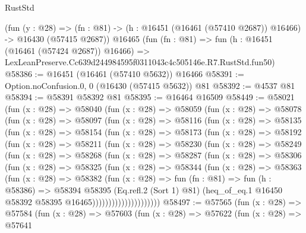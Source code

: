 \begin{lexlean}{RustStd}
\begin{coremodule}
    (fun (y : @28) =>
    (fn : @81) -> (h : @16451 (@16461 (@57410 @2687)) @16466) -> @16430 (@57415 @2687))
    @16465
    (fun (fn : @81) =>
    fun (h : @16451 (@16461 (@57424 @2687)) @16466) =>
    LexLeanPreserve.Cc639d244984595f0311043c4c505146e.R7.RustStd.fun50)
@58386 := @16451 (@16461 (@57410 @5632)) @16466
@58391 := Option.noConfusion.{0, 0} (@16430 (@57415 @5632)) @81
@58392 := @4537 @81
@58394 := @58391 @58392 @81
@58395 := @16464 @16509
@58449 := @58021
    (fun (x : @28) =>
    @58040
      (fun (x : @28) =>
      @58059
        (fun (x : @28) =>
        @58078
          (fun (x : @28) =>
          @58097
            (fun (x : @28) =>
            @58116
              (fun (x : @28) =>
              @58135
                (fun (x : @28) =>
                @58154
                  (fun (x : @28) =>
                  @58173
                    (fun (x : @28) =>
                    @58192
                      (fun (x : @28) =>
                      @58211
                        (fun (x : @28) =>
                        @58230
                          (fun (x : @28) =>
                          @58249
                            (fun (x : @28) =>
                            @58268
                              (fun (x : @28) =>
                              @58287
                                (fun (x : @28) =>
                                @58306
                                  (fun (x : @28) =>
                                  @58325
                                    (fun (x : @28) =>
                                    @58344
                                      (fun (x : @28) =>
                                      @58363
                                        (fun (x : @28) =>
                                        @58382
                                          (fun (x : @28) =>
                                          fun (fn : @81) =>
                                          fun (h : @58386) =>
                                          @58394
                                            @58395
                                            (Eq.refl.{2} (Sort 1) @81)
                                            (heq_of_eq.{1}
                                              @16450
                                              @58392
                                              @58395
                                              @16465)))))))))))))))))))))
@58497 := @57565
    (fun (x : @28) =>
    @57584
      (fun (x : @28) =>
      @57603
        (fun (x : @28) =>
        @57622
          (fun (x : @28) =>
          @57641

\end{coremodule}
\end{lexlean}
